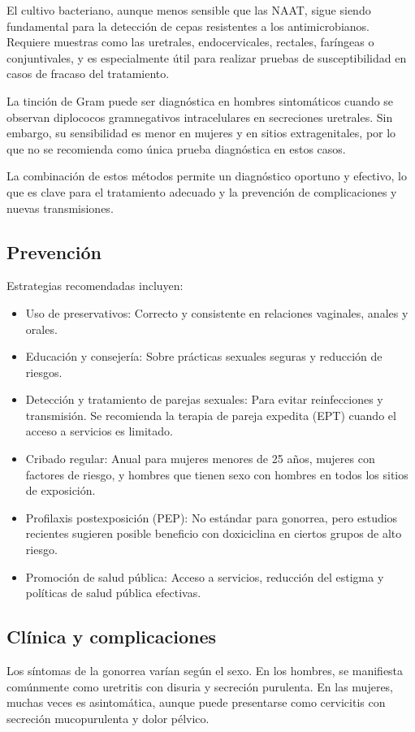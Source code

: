 El cultivo bacteriano, aunque menos sensible que las NAAT, sigue siendo fundamental para la detección de cepas resistentes a los antimicrobianos. Requiere muestras como las uretrales, endocervicales, rectales, faríngeas o conjuntivales, y es especialmente útil para realizar pruebas de susceptibilidad en casos de fracaso del tratamiento.

La tinción de Gram puede ser diagnóstica en hombres sintomáticos cuando se observan diplococos gramnegativos intracelulares en secreciones uretrales. Sin embargo, su sensibilidad es menor en mujeres y en sitios extragenitales, por lo que no se recomienda como única prueba diagnóstica en estos casos.

La combinación de estos métodos permite un diagnóstico oportuno y efectivo, lo que es clave para el tratamiento adecuado y la prevención de complicaciones y nuevas transmisiones.

\subsection{Prevención}
Estrategias recomendadas incluyen:
\begin{itemize}
    \item Uso de preservativos: Correcto y consistente en relaciones vaginales, anales y orales.
    \item Educación y consejería: Sobre prácticas sexuales seguras y reducción de riesgos.
    \item Detección y tratamiento de parejas sexuales: Para evitar reinfecciones y transmisión. Se recomienda la terapia de pareja expedita (EPT) cuando el acceso a servicios es limitado.
    \item Cribado regular: Anual para mujeres menores de 25 años, mujeres con factores de riesgo, y hombres que tienen sexo con hombres en todos los sitios de exposición.
    \item Profilaxis postexposición (PEP): No estándar para gonorrea, pero estudios recientes sugieren posible beneficio con doxiciclina en ciertos grupos de alto riesgo.
    \item Promoción de salud pública: Acceso a servicios, reducción del estigma y políticas de salud pública efectivas.
\end{itemize}

\subsection{Clínica y complicaciones}
Los síntomas de la gonorrea varían según el sexo. En los hombres, se manifiesta comúnmente como uretritis con disuria y secreción purulenta. En las mujeres, muchas veces es asintomática, aunque puede presentarse como cervicitis con secreción mucopurulenta y dolor pélvico.

